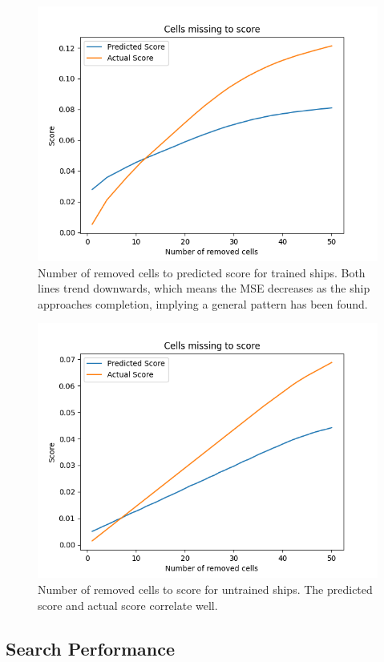 \documentclass{l4proj}
\begin{document}
 

\begin{figure}[h!]
\centering
\includegraphics[width=0.8\linewidth]{dissertation/images/graphs/cells_missing_to_score_trained.png}
\caption{Number of removed cells to predicted score for trained ships. Both lines trend downwards, which means the MSE decreases as the ship approaches completion, implying a general pattern has been found.}
\label{fig:subim1}
\end{figure}

\begin{figure}[h!]
\centering
\includegraphics[width=0.8\linewidth]{dissertation/images/graphs/cells_missing_to_score_test.png}
\caption{Number of removed cells to score for untrained ships. The predicted score and actual score correlate well.}
\label{fig:subim1}
\end{figure}

\subsection{Search Performance}
\end{document}
